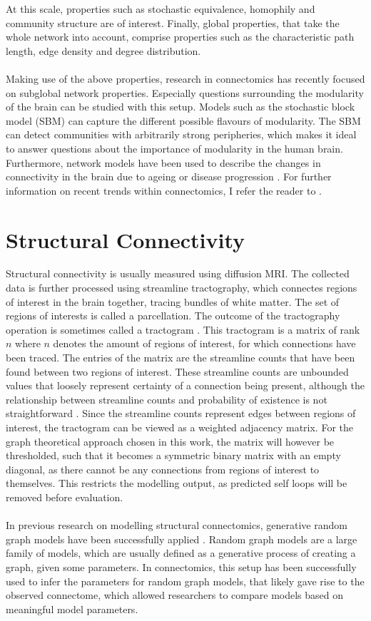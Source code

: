 \documentclass[11pt]{report} %
\begin{document}
At this scale, properties such as stochastic equivalence, homophily and community structure are of interest. 
Finally, global properties, that take the whole network into account, comprise properties such as the characteristic path length, edge density and degree distribution.\\\\
Making use of the above properties, research in connectomics has recently focused on subglobal network properties. 
Especially questions surrounding the modularity of the brain can be studied with this setup. Models such as the stochastic block model (SBM) can capture the different possible flavours of modularity. 
The SBM can detect communities with arbitrarily strong peripheries, which makes it ideal to answer questions about the importance of modularity in the human brain. 
Furthermore, network models have been used to describe the changes in connectivity in the brain due to ageing or disease progression \cite{geerligs2014, yuan2017, roy2019}. 
For further information on recent trends within connectomics, I refer the reader to . 
    \section{Structural Connectivity}
Structural connectivity is usually measured using diffusion MRI. The collected data is further processed using streamline tractography, which connectes regions of interest in the brain together, tracing bundles of white matter. The set of regions of interests is called a parcellation. The outcome of the tractography operation is sometimes called a tractogram \cite{yeh2020}. This tractogram is a matrix of rank $n$ where $n$ denotes the amount of regions of interest, for which connections have been traced. The entries of the matrix are the streamline counts that have been found between two regions of interest. These streamline counts are unbounded values that loosely represent certainty of a connection being present, although the relationship between streamline counts and probability of existence is not straightforward \cite{roberts2017}. Since the streamline counts represent edges between regions of interest, the tractogram can be viewed as a weighted adjacency matrix. For the graph theoretical approach chosen in this work, the matrix will however be thresholded, such that it becomes a symmetric binary matrix with an empty diagonal, as there cannot be any connections from regions of interest to themselves. This restricts the modelling output, as predicted self loops will be removed before evaluation.\\\\
In previous research on modelling structural connectomics, generative random graph models have been successfully applied \cite{bullmore2011, simpson2011}. Random graph models are a large family of models, which are usually defined as a generative process of creating a graph, given some parameters. In connectomics, this setup has been successfully used to infer the parameters for random graph models, that likely gave rise to the observed connectome, which allowed researchers to compare models based on meaningful model parameters.
\end{document}
